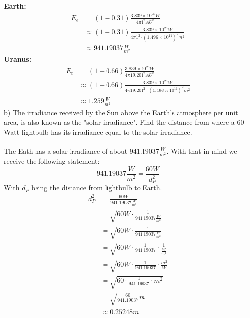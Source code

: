 \textbf{Earth:}
\begin{equation*}
    \begin{split}
        E_e &= (1 - 0.31) \frac{3.839 \times 10^{26}W}{4 \pi 1^2 AU^2}\\
            &\approx (1 - 0.31) \frac{3.839 \times 10^{26}W}{4 \pi 1^2 \cdot (1.496 \times 10^{11})^2 m^2}\\
            &\approx 941.19037 \frac{W}{m^2}
    \end{split}
\end{equation*}
\textbf{Uranus:}
\begin{equation*}
    \begin{split}
        E_e &= (1 - 0.66) \frac{3.839 \times 10^{26}W}{4 \pi 19.201^2 AU^2}\\
            &\approx (1 - 0.66) \frac{3.839 \times 10^{26}W}{4 \pi 19.201^2 \cdot (1.496 \times 10^{11})^2 m^2}\\
            &\approx 1.259 \frac{W}{m^2}
    \end{split}
\end{equation*}
b) The irradiance received by the Sun above the Earth's atmosphere per unit area, is also known as the
"solar irradiance". Find the distance from where a 60-Watt lightbulb has its irradiance equal to the solar
irradiance.\\
\\
The Eath has a solar irradiance of about $941.19037 \frac{W}{m^2}$. With that in mind we receive the 
following statement:
\begin{equation*}
    941.19037 \frac{W}{m^2} = \frac{60 W}{d_P^2}
\end{equation*}
With $d_P$ being the distance from lightbulb to Earth.
\begin{equation*}
    \begin{split}
        d_P^2 &= \frac{60 W}{941.19037 \frac{W}{m^2}}\\
              &= \sqrt{60 W \cdot \frac{1}{941.19037 \frac{W}{m^2}}}\\
              &= \sqrt{60 W \cdot \frac{1}{941.19037 \frac{W}{m^2}}}\\
              &= \sqrt{60 W \cdot \frac{1}{941.19037} \cdot \frac{1}{\frac{W}{m^2}}}\\
              &= \sqrt{60 W \cdot \frac{1}{941.19037} \cdot \frac{m^2}{W}}\\
              &= \sqrt{60 \cdot \frac{1}{941.19037} \cdot m^2}\\
              &= \sqrt{\frac{60}{941.19037}}m\\
              &\approx 0.25248m
    \end{split}
\end{equation*}

